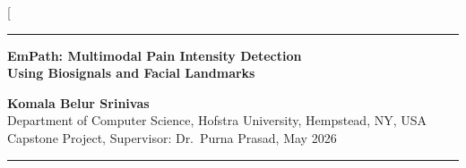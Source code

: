 \documentclass[10pt, twocolumn]{article}
\begin{document}
\thispagestyle{firstpage}

\twocolumn[{
  \begin{center}
    \vspace*{0.3em}
    {\color{journalblue}\rule{\textwidth}{1pt}}
    \vspace{0.8em}

    {\LARGE\bfseries\color{journalblue}
      EmPath: Multimodal Pain Intensity Detection\\[0.3em]
      Using Biosignals and Facial Landmarks}

    \vspace{0.8em}

    {\large\textbf{Komala Belur Srinivas}}\\[0.3em]
    {\small Department of Computer Science, Hofstra University, Hempstead, NY, USA}\\
    {\small Capstone Project, Supervisor: Dr.~Purna Prasad, May 2026}

    \vspace{0.8em}
    {\color{journalblue}\rule{\textwidth}{0.5pt}}
    \vspace{0.5em}
  \end{center}

}
\end{document}
